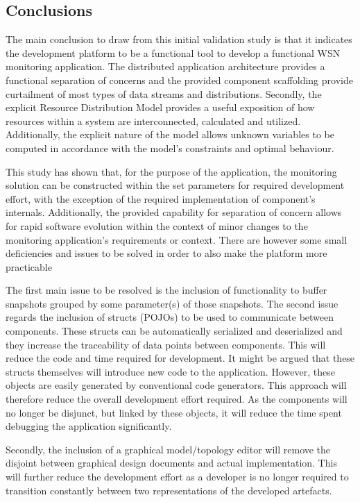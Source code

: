 \subsection{Conclusions}
The main conclusion to draw from this initial validation study is that it indicates the development platform to be a functional tool to develop a functional WSN monitoring application. The distributed application architecture provides a functional separation of concerns and the provided component scaffolding provide curtailment of most types of data streams and distributions. Secondly, the explicit Resource Distribution Model provides a useful exposition of how resources within a system are interconnected, calculated and utilized. Additionally, the explicit nature of the model allows unknown variables to be computed in accordance with the model's constraints and optimal behaviour.

This study has shown that, for the purpose of the \idsystems\sensit application, the monitoring solution can be constructed within the set parameters for required development effort, with the exception of the required implementation of component's internals. Additionally, the provided capability for separation of concern allows for rapid software evolution within the context of minor changes to the monitoring application's requirements or context. There are however some small deficiencies and issues to be solved in order to also make the platform more practicable

The first main issue to be resolved is the inclusion of functionality to buffer snapshots grouped by some parameter(s) of those snapshots. The second issue regards the inclusion of structs (POJOs) to be used to communicate between components. These structs can be automatically serialized and deserialized and they increase the traceability of data points between components. This will reduce the code and time required for development. It might be argued that these structs themselves will introduce new code to the application. However, these objects are easily generated by conventional code generators. This approach will therefore reduce the overall development effort required. As the components will no longer be disjunct, but linked by these objects, it will reduce the time spent debugging the application significantly.

Secondly, the inclusion of a graphical model/topology editor will remove the disjoint between graphical design documents and actual implementation. This will further reduce the development effort as a developer is no longer required to transition constantly between two representations of the developed artefacts.

